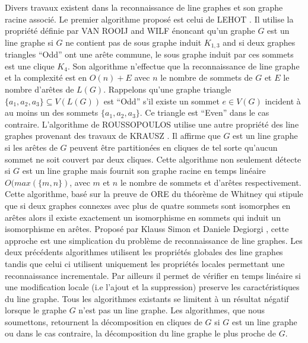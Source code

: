 Divers travaux existent dans la reconnaissance de line graphes et son graphe racine associ\'e.
\newline
Le premier algorithme propos\'e est celui de LEHOT \cite{decompositionEnCliquesParArcs}. Il utilise la propri\'et\'e d\'efinie par VAN ROOIJ and WILF \cite{ROOIJetWILF1965interchange} \'enoncant qu'un graphe $G$ est un line graphe si $G$ ne contient pas de sous graphe induit $K_{1,3}$ and si deux graphes triangles ``Odd'' ont une ar\^ete commune, le sous graphe induit par ces sommets est une clique $K_4$.
Son algorithme n'effectue que la reconnaissance de line graphe et la complexit\'e est en $O(n) + E$ avec $n$ le nombre de sommets de $G$ et $E$ le nombre d'ar\^etes de $L(G)$.
Rappelons qu'une graphe triangle $\{a_1,a_2,a_3\} \subseteq V(L(G))$ est ``Odd'' s'il existe un sommet $e \in V(G)$ incident \`a  au moins un des sommets $\{a_1, a_2, a_3\}$. Ce triangle est ``Even'' dans le cas contraire. 
\newline
L'algorithme de ROUSSOPOULOS utilise une autre propri\'et\'e des line graphes provenant des travaux de KRAUSZ \cite{krausz1943demonstration}. Il affirme que $G$ est un line graphe si les ar\^etes  de  $G$ peuvent \^etre partition\'ees en cliques  de tel sorte qu'aucun sommet ne soit couvert par deux cliques. 
Cette algorithme non seulement d\'etecte si $G$ est un line graphe mais fournit son graphe racine en temps lin\'eaire $O(max(\{m,n\})$, avec $m$ et $n$ le nombre de sommets et d'ar\^etes respectivement.
\newline
Cette algorithme, bas\'e sur la preuve de ORE \cite{ORE} du th\'eor\`eme de Whitney \cite{whitney1932congruent} qui stipule que si deux graphes connexes avec plus de quatre sommets sont isomorphes en ar\^etes alors il existe exactement un isomorphisme en sommets qui induit un isomorphisme en ar\^etes.  
Propos\'e par Klauss Simon et Daniele Degiorgi \cite{decompositionEnCliques}, cette approche est une simplication du probl\`eme de reconnaissance de line graphes. Les deux pr\'ec\'edents algorithmes  utilisent les propri\'et\'es globales des line graphes tandis que celui ci utilisent uniquement les propri\'et\'es locales permettant une reconnaissance incrementale. Par ailleurs il permet de v\'erifier en temps lin\'eaire si une modification locale (i.e l'ajout et la suppression) preserve les caract\'eristiques du line graphe.
\newline
Tous les algorithmes existants se limitent \`a un r\'esultat n\'egatif lorsque le graphe $G$ n'est pas un line graphe.
Les algorithmes, que nous soumettons, retournent la d\'ecomposition en cliques de $G$ si $G$ est un line graphe ou dans le cas contraire, la d\'ecomposition du line graphe le plus proche de $G$.

%